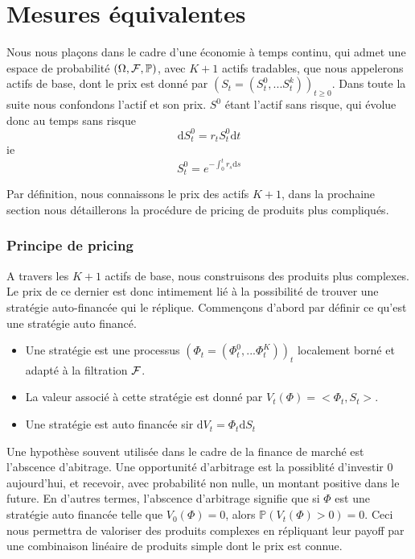 \section{Mesures équivalentes}

Nous nous plaçons dans le cadre d'une économie à temps continu, qui admet une espace de probabilité $(\Omega, \cal{F}, \mathbb{P})$, avec $K+1$ actifs tradables, que nous appelerons actifs de base, dont le prix est donné par $(S_t = (S^0_t, ...S^k_t))_{t \geq 0}$. Dans toute la suite nous confondons l'actif et son prix.
$S^0$ étant l'actif sans risque, qui évolue donc au temps sans risque $$\mathrm{d}S^0_t = r_t S^0_t \mathrm{d}t$$
ie $$S^0_t = e^{-\int_0^t r_s \mathrm{d}s}$$

Par définition, nous connaissons le prix des actifs $K+1$, dans la prochaine section nous détaillerons la procédure de pricing de produits plus compliqués.

\subsubsection{Principe de pricing}
A travers les $K+1$ actifs de base, nous construisons des produits plus complexes. 
Le prix de ce dernier est donc intimement lié à la possibilité de trouver une stratégie auto-financée qui le réplique.
Commençons d'abord par définir ce qu'est une stratégie auto financé.

\begin{defn}
  \begin{itemize}
  \item Une stratégie est une processus $(\Phi_t = (\Phi^0_t, ... \Phi^K_t))_t$ localement borné et adapté à la filtration $\cal{F}$.
  \item La valeur associé à cette stratégie est donné par $V_t(\Phi) = <\Phi_t, S_t>$.
  \item Une stratégie est auto financée sir $\mathrm{d}V_t = \Phi_t \mathrm{d}S_t$
  \end{itemize}
\end{defn}

Une hypothèse souvent utilisée dans le cadre de la finance de marché est l'abscence d'abitrage. Une opportunité d'arbitrage est la possiblité d'investir 0 aujourd'hui, et recevoir, avec probabilité non nulle, un montant positive dans le future. En d'autres termes, l'abscence d'arbitrage signifie que si $\Phi$ est une stratégie auto financée telle que $V_0(\Phi) = 0$, alors $\mathbb{P} ( V_t(\Phi) > 0 ) = 0$. Ceci nous permettra de valoriser des produits complexes en répliquant leur payoff par une combinaison linéaire de produits simple dont le prix est connue.

